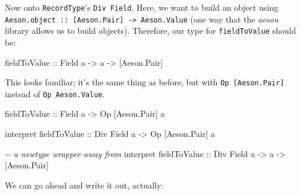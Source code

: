 \documentclass[]{article}
\newenvironment{Shaded}{}{}
\newcommand{\CommentTok}[1]{\textcolor[rgb]{0.38,0.63,0.69}{\textit{#1}}}
\newcommand{\DataTypeTok}[1]{\textcolor[rgb]{0.56,0.13,0.00}{#1}}
\newcommand{\NormalTok}[1]{#1}
\newcommand{\OperatorTok}[1]{\textcolor[rgb]{0.40,0.40,0.40}{#1}}
\newcommand{\OtherTok}[1]{\textcolor[rgb]{0.00,0.44,0.13}{#1}}
\begin{document}
Now onto \texttt{RecordType}'s \texttt{Div\ Field}. Here, we want to build an
object using
\texttt{Aeson.object\ ::\ {[}Aeson.Pair{]}\ -\textgreater{}\ Aeson.Value} (one
way that the \emph{aeson} library allows us to build objects). Therefore, our
type for \texttt{fieldToValue} should be:

\begin{Shaded}
\begin{Highlighting}[]
\OtherTok{fieldToValue ::} \DataTypeTok{Field}\NormalTok{ a }\OtherTok{{-}>}\NormalTok{ a }\OtherTok{{-}>}\NormalTok{ [}\DataTypeTok{Aeson.Pair}\NormalTok{]}
\end{Highlighting}
\end{Shaded}

This looks familiar; it's the same thing as before, but with
\texttt{Op\ {[}Aeson.Pair{]}} instead of \texttt{Op\ Aeson.Value}.

\begin{Shaded}
\begin{Highlighting}[]
\OtherTok{fieldToValue ::} \DataTypeTok{Field}\NormalTok{ a }\OtherTok{{-}>} \DataTypeTok{Op}\NormalTok{ [}\DataTypeTok{Aeson.Pair}\NormalTok{] a}

\NormalTok{interpret}\OtherTok{ fieldToValue ::} \DataTypeTok{Div} \DataTypeTok{Field}\NormalTok{ a }\OtherTok{{-}>} \DataTypeTok{Op}\NormalTok{ [}\DataTypeTok{Aeson.Pair}\NormalTok{] a}

\CommentTok{{-}{-} a newtype wrapper away from}
\NormalTok{interpret}\OtherTok{ fieldToValue ::} \DataTypeTok{Div} \DataTypeTok{Field}\NormalTok{ a }\OtherTok{{-}>}\NormalTok{ a }\OtherTok{{-}>}\NormalTok{ [}\DataTypeTok{Aeson.Pair}\NormalTok{]}
\end{Highlighting}
\end{Shaded}

We can go ahead and write it out, actually:

\begin{Shaded}
\end{Shaded}
\end{document}
